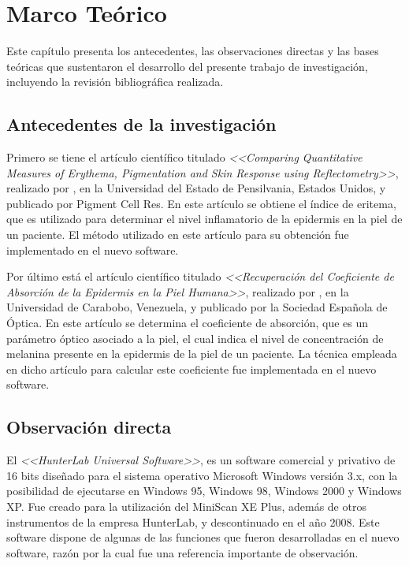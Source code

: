 \chapter{Marco Te\'{o}rico}

Este cap\'{i}tulo presenta los antecedentes, las observaciones directas y las bases te\'{o}ricas que sustentaron el desarrollo del presente trabajo de investigaci\'{o}n, incluyendo la revisi\'{o}n bibliogr\'{a}fica realizada.

	\section{Antecedentes de la investigaci\'{o}n}	
			
			Primero se tiene el art\'{i}culo cient\'{i}fico titulado \textit{<<Comparing Quantitative Measures of Erythema, Pigmentation and Skin Response using Reflectometry>>}, realizado por \cite{Wagner}, en la Universidad del Estado de Pensilvania, Estados Unidos, y publicado por Pigment Cell Res. En este art\'{i}culo se obtiene el \'{i}ndice de eritema, que es utilizado para determinar el nivel inflamatorio de la epidermis en la piel de un paciente. El m\'{e}todo utilizado en este art\'{i}culo para su obtenci\'{o}n fue implementado en el nuevo software.
			
			Por	\'{u}ltimo est\'{a} el art\'{i}culo cient\'{i}fico titulado \textit{<<Recuperaci\'{o}n del Coeficiente de Absorci\'{o}n de la Epidermis en la Piel Humana>>}, realizado por \cite{Narea}, en la Universidad de Carabobo, Venezuela, y publicado por la Sociedad Espa\~{n}ola de \'{O}ptica. En este art\'{i}culo se determina el coeficiente de absorci\'{o}n, que es un par\'{a}metro \'{o}ptico asociado a la piel, el cual indica el nivel de concentraci\'{o}n de melanina presente en la epidermis de la piel de un paciente. La t\'{e}cnica empleada en dicho art\'{i}culo para calcular este coeficiente fue implementada en el nuevo software.

	\section{Observaci\'{o}n directa}
		
			El \textit{<<HunterLab Universal Software>>}, es un software comercial y privativo de 16 bits dise\~{n}ado para el sistema operativo Microsoft Windows versi\'{o}n 3.x, con la posibilidad de ejecutarse en Windows 95, Windows 98, Windows 2000 y Windows XP. Fue creado para la utilizaci\'{o}n del MiniScan XE Plus, adem\'{a}s de otros instrumentos de la empresa HunterLab, y descontinuado en el a\~{n}o 2008. Este software dispone de algunas de las funciones que fueron desarrolladas en el nuevo software, raz\'{o}n por la cual fue una referencia importante de observaci\'{o}n.

